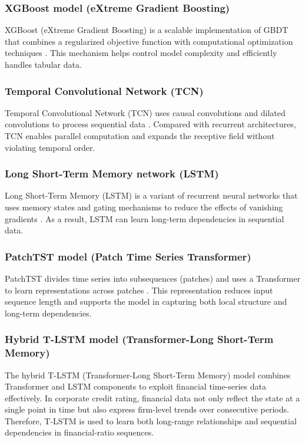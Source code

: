 \documentclass[10pt,twoside]{article}
\begin{document}
\subsubsection{XGBoost model (eXtreme Gradient Boosting)}
XGBoost (eXtreme Gradient Boosting) is a scalable implementation of GBDT that combines a regularized objective function with computational optimization techniques \cite{chen_xgboost_2016}. This mechanism helps control model complexity and efficiently handles tabular data.
\subsubsection{Temporal Convolutional Network (TCN)}
Temporal Convolutional Network (TCN) uses causal convolutions and dilated convolutions to process sequential data \cite{bai_empirical_2018}. Compared with recurrent architectures, TCN enables parallel computation and expands the receptive field without violating temporal order.
\subsubsection{Long Short-Term Memory network (LSTM)}
Long Short-Term Memory (LSTM) is a variant of recurrent neural networks that uses memory states and gating mechanisms to reduce the effects of vanishing gradients \cite{hochreiter_long_1997}. As a result, LSTM can learn long-term dependencies in sequential data.
\subsubsection{PatchTST model (Patch Time Series Transformer)}
PatchTST divides time series into subsequences (patches) and uses a Transformer to learn representations across patches \cite{nie_time_2023}. This representation reduces input sequence length and supports the model in capturing both local structure and long-term dependencies.
\subsubsection{Hybrid T-LSTM model (Transformer-Long Short-Term Memory)}
The hybrid T-LSTM (Transformer-Long Short-Term Memory) model \cite{kofune_enhancing_2026} combines Transformer and LSTM components to exploit financial time-series data effectively. In corporate credit rating, financial data not only reflect the state at a single point in time but also express firm-level trends over consecutive periods. Therefore, T-LSTM is used to learn both long-range relationships and sequential dependencies in financial-ratio sequences.
\end{document}
